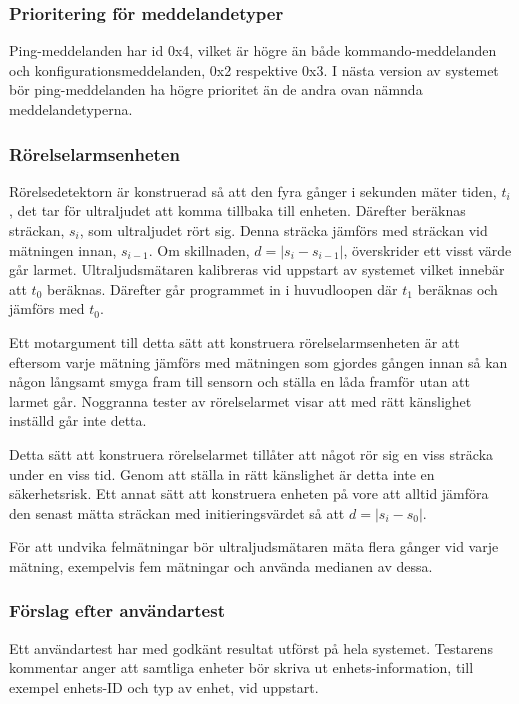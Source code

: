 \subsubsection*{Prioritering för meddelandetyper}

Ping-meddelanden har id 0x4, vilket är högre än både kommando-meddelanden och konfigurationsmeddelanden, 0x2 respektive 0x3. I nästa version av systemet bör ping-meddelanden ha högre prioritet än de andra ovan nämnda meddelandetyperna.

\subsubsection*{Rörelselarmsenheten}

Rörelsedetektorn är konstruerad så att den fyra gånger i sekunden mäter tiden, $t_{i}$, det tar för ultraljudet att komma tillbaka till enheten. Därefter beräknas sträckan, $s_{i}$, som ultraljudet rört sig. Denna sträcka jämförs med sträckan vid mätningen innan, $s_{i-1}$. Om skillnaden, $d = | s_{i} - s_{i-1} |$, överskrider ett visst värde går larmet. Ultraljudsmätaren kalibreras vid uppstart av systemet vilket innebär att $t_{0}$ beräknas. Därefter går programmet in i huvudloopen där $t_{1}$ beräknas och jämförs med $t_{0}$.

Ett motargument till detta sätt att konstruera rörelselarmsenheten är att eftersom varje mätning jämförs med mätningen som gjordes gången innan så kan någon långsamt smyga fram till sensorn och ställa en låda framför utan att larmet går. Noggranna tester av rörelselarmet visar att med rätt känslighet inställd går inte detta.

Detta sätt att konstruera rörelselarmet tillåter att något rör sig en viss sträcka under en viss tid. Genom att ställa in rätt känslighet är detta inte en säkerhetsrisk. Ett annat sätt att konstruera enheten på vore att alltid jämföra den senast mätta sträckan med initieringsvärdet så att $d = | s_{i} - s_{0} |$.

För att undvika felmätningar bör ultraljudsmätaren mäta flera gånger vid varje mätning, exempelvis fem mätningar och använda medianen av dessa.


\subsubsection*{Förslag efter användartest}

Ett användartest har med godkänt resultat utförst på hela systemet. Testarens kommentar anger att samtliga enheter bör skriva ut enhets-information, till exempel enhets-ID och typ av enhet, vid uppstart.
